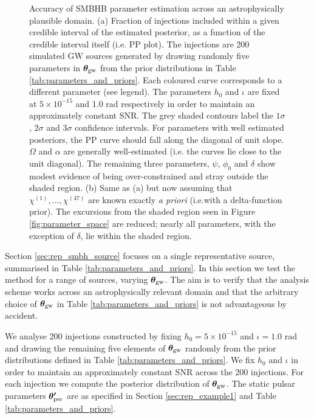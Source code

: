 \documentclass[fleqn,usenatbib,useAMS]{mnras}
\begin{document}
\begin{figure}
	\caption{Accuracy of SMBHB parameter estimation across an astrophysically plausible domain. (a) Fraction of injections included within a given credible interval of the estimated posterior, as a function of the credible interval itself (i.e. PP plot). The injections are 200 simulated GW sources generated by drawing randomly five parameters in $\boldsymbol{\theta}_{\rm gw}$ from the prior distributions in Table \ref{tab:parameters_and_priors}. Each coloured curve corresponds to a different parameter (see legend). The parameters $h_0$ and $\iota$ are fixed at $5 \times 10^{-15}$ and 1.0 rad respectively in order to maintain an approximately constant SNR. The grey shaded contours label the $1\sigma$, $2\sigma$ and 3$\sigma$ confidence intervals. For parameters with well estimated posteriors, the PP curve should fall along the diagonal of unit slope. $\Omega$ and $\alpha$ are generally well-estimated (i.e. the curves lie close to the unit diagonal). The remaining three parameters, $\psi$, $\phi_0$ and $\delta$ show modest evidence of being over-constrained and stray outside the shaded region. (b) Same as (a) but now assuming that $\chi^{(1)}, \dots, \chi^{(47)}$ are known exactly \textit{a priori} (i.e.with a delta-function prior). The excursions from the shaded region seen in Figure  \ref{fig:parameter_space} are reduced; nearly all parameters, with the exception of $\delta$, lie within the shaded region. } \label{fig:AB}
\end{figure}


Section \ref{sec:rep_smbh_source} focuses on a single representative source, summarised in Table \ref{tab:parameters_and_priors}. In this section we test the method for a range of sources, varying $\boldsymbol{\theta}_{\rm gw}$. The aim is to verify that the analysis scheme works across an astrophysically relevant domain and that the arbitrary choice of $\boldsymbol{\theta}_{\rm gw}$ in Table \ref{tab:parameters_and_priors} is not advantageous by accident. \newline 

We analyse 200 injections constructed by fixing $h_0 = 5 \times 10^{-15}$ and $\iota =1.0$ rad and drawing the remaining five elements of $\boldsymbol{\theta}_{\rm gw}$ randomly from the prior distributions defined in Table \ref{tab:parameters_and_priors}. We fix $h_0$ and $\iota$ in order to maintain an approximately constant SNR across the 200 injections. For each injection we compute the posterior distribution of ${\boldsymbol{\theta}}_{\rm gw}$. The static pulsar parameters $\boldsymbol{\theta'}_{\rm psr}$ are as specified in Section \ref{sec:rep_example1} and Table  \ref{tab:parameters_and_priors}. \newline 
\end{document}
